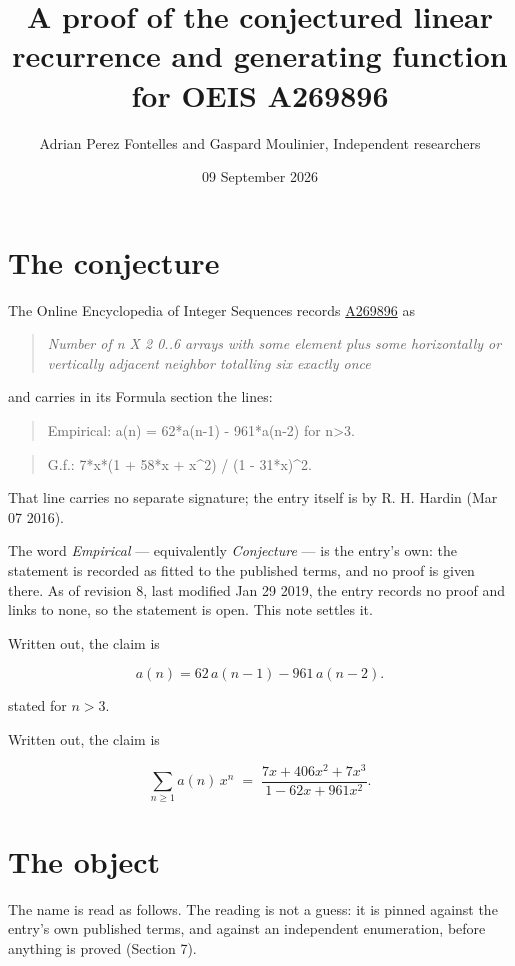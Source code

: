 \documentclass[11pt]{article}
\title{A proof of the conjectured linear recurrence and generating function for OEIS A269896}
\author{Adrian Perez Fontelles and Gaspard Moulinier, Independent researchers}
\date{09 September 2026}
\theoremstyle{definition}
\begin{document}
\maketitle
\section{The conjecture}

The Online Encyclopedia of Integer Sequences records \href{https://oeis.org/A269896}{A269896} as

\begin{quote}\itshape Number of n X 2 0..6 arrays with some element plus some horizontally or vertically adjacent neighbor totalling six exactly once\end{quote}

and carries in its Formula section the lines:

\begin{quote}\ttfamily Empirical: a(n) = 62*a(n-1) - 961*a(n-2) for n>3.\end{quote}

\begin{quote}\ttfamily G.f.: 7*x*(1 + 58*x + x\textasciicircum{}2) / (1 - 31*x)\textasciicircum{}2.\end{quote}

That line carries no separate signature; the entry itself is by R. H. Hardin (Mar 07 2016).

The word {\itshape Empirical} --- equivalently {\itshape Conjecture} --- is the entry's own: the statement is recorded as fitted to the published terms, and no proof is given there. As of revision 8, last modified Jan 29 2019, the entry records no proof and links to none, so the statement is open. This note settles it.

Written out, the claim is

\[a(n) = 62\,a(n-1) - 961\,a(n-2).\]

stated for $n > 3$.

Written out, the claim is

\[\sum_{n \ge 1} a(n)\,x^n \;=\; \frac{7x + 406x^{2} + 7x^{3}}{1 - 62x + 961x^{2}}.\]

\section{The object}

The name is read as follows. The reading is not a guess: it is pinned against the entry's own published terms, and against an independent enumeration, before anything is proved (Section 7).
\end{document}
